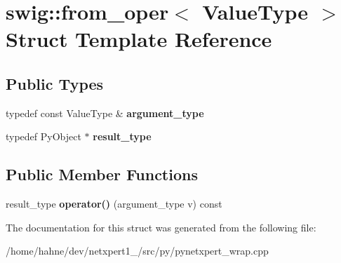 \hypertarget{structswig_1_1from__oper}{}\section{swig\+:\+:from\+\_\+oper$<$ Value\+Type $>$ Struct Template Reference}
\label{structswig_1_1from__oper}
\subsection*{Public Types}
\begin{DoxyCompactItemize}
\item 
typedef const Value\+Type \& {\bfseries argument\+\_\+type}\hypertarget{structswig_1_1from__oper_a33151174816bb2d002b7b504bcfc1902}{}\label{structswig_1_1from__oper_a33151174816bb2d002b7b504bcfc1902}

\item 
typedef Py\+Object $\ast$ {\bfseries result\+\_\+type}\hypertarget{structswig_1_1from__oper_aceed5a894a65b69078106cda841f6021}{}\label{structswig_1_1from__oper_aceed5a894a65b69078106cda841f6021}

\end{DoxyCompactItemize}
\subsection*{Public Member Functions}
\begin{DoxyCompactItemize}
\item 
result\+\_\+type {\bfseries operator()} (argument\+\_\+type v) const \hypertarget{structswig_1_1from__oper_a5326a4471e2a7e374b63b06d3c0a44ce}{}\label{structswig_1_1from__oper_a5326a4471e2a7e374b63b06d3c0a44ce}

\end{DoxyCompactItemize}


The documentation for this struct was generated from the following file\+:\begin{DoxyCompactItemize}
\item 
/home/hahne/dev/netxpert1\+\_/src/py/pynetxpert\+\_\+wrap.\+cpp\end{DoxyCompactItemize}
